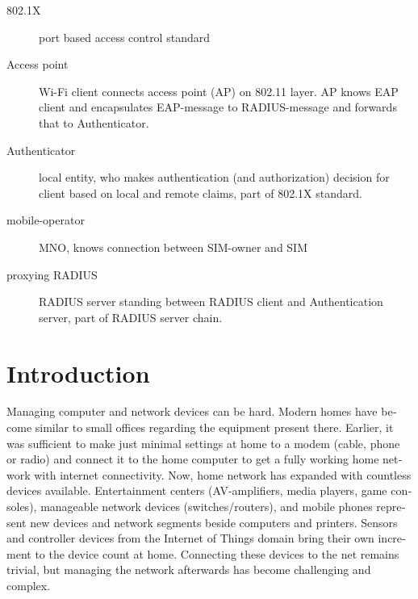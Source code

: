 \documentclass[12pt,a4paper,english]{tutthesis}
\begin{document}
\begin{otherlanguage}{english}

\begin{description}
\item[{802.1X}] port based access control standard
\item[{Access point}] Wi-Fi client connects access point (AP) on 802.11
layer. AP knows EAP client and encapsulates EAP-message
to RADIUS-message and forwards that to
Authenticator.
\end{description}
\begin{description}
\item[{Authenticator}] local entity, who makes authentication (and
authorization) decision for client based on local and remote
claims, part of 802.1X standard.
\end{description}
\begin{description}
\item[{mobile-operator}] MNO, knows connection between SIM-owner and SIM
\end{description}
\begin{description}
\item[{proxying RADIUS}] RADIUS server standing between RADIUS
client and Authentication server, part of RADIUS server chain.
\end{description}



\if@twoside
\cleardoublepage
\fi

\newpage             %
\setcounter{page}{1} %
\renewcommand{\chaptername}{} %

\chapter{Introduction}
\label{sec-1}
\label{cha:intro}


Managing computer and network devices can be hard.  Modern homes have
become similar to small offices regarding the equipment present there.
Earlier, it was sufficient to make just minimal settings at home to a
modem (cable, phone or radio) and connect it to the home computer to
get a fully working home network with internet connectivity.  Now, home
network has expanded with countless devices available. 
Entertainment centers (AV-amplifiers, media players, game consoles),
manageable network devices (switches/routers), and mobile phones
represent new devices and network segments beside computers and
printers. Sensors and controller devices from the Internet of Things
domain bring their own increment to the device count at home.
Connecting these devices to the net remains trivial, but managing the
network afterwards has become challenging and complex.


\end{otherlanguage}
\end{document}
